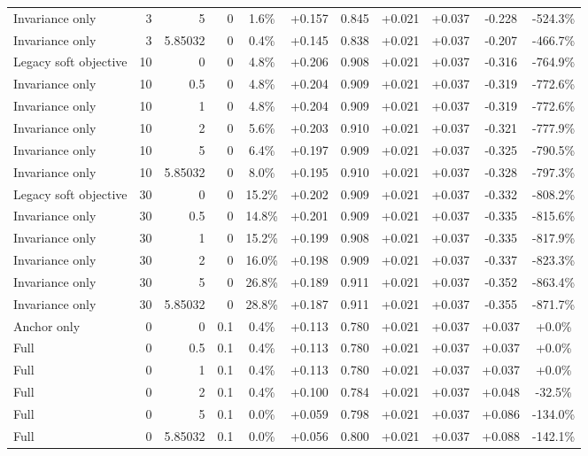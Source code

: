\begin{table}[htbp]
\begin{tabular}{lrrrccccccc}
Invariance only & 3 & 5 & 0 & 1.6\% & +0.157 & 0.845 & +0.021 & +0.037 & -0.228 & -524.3\% \\
Invariance only & 3 & 5.85032 & 0 & 0.4\% & +0.145 & 0.838 & +0.021 & +0.037 & -0.207 & -466.7\% \\
Legacy soft objective & 10 & 0 & 0 & 4.8\% & +0.206 & 0.908 & +0.021 & +0.037 & -0.316 & -764.9\% \\
Invariance only & 10 & 0.5 & 0 & 4.8\% & +0.204 & 0.909 & +0.021 & +0.037 & -0.319 & -772.6\% \\
Invariance only & 10 & 1 & 0 & 4.8\% & +0.204 & 0.909 & +0.021 & +0.037 & -0.319 & -772.6\% \\
Invariance only & 10 & 2 & 0 & 5.6\% & +0.203 & 0.910 & +0.021 & +0.037 & -0.321 & -777.9\% \\
Invariance only & 10 & 5 & 0 & 6.4\% & +0.197 & 0.909 & +0.021 & +0.037 & -0.325 & -790.5\% \\
Invariance only & 10 & 5.85032 & 0 & 8.0\% & +0.195 & 0.910 & +0.021 & +0.037 & -0.328 & -797.3\% \\
Legacy soft objective & 30 & 0 & 0 & 15.2\% & +0.202 & 0.909 & +0.021 & +0.037 & -0.332 & -808.2\% \\
Invariance only & 30 & 0.5 & 0 & 14.8\% & +0.201 & 0.909 & +0.021 & +0.037 & -0.335 & -815.6\% \\
Invariance only & 30 & 1 & 0 & 15.2\% & +0.199 & 0.908 & +0.021 & +0.037 & -0.335 & -817.9\% \\
Invariance only & 30 & 2 & 0 & 16.0\% & +0.198 & 0.909 & +0.021 & +0.037 & -0.337 & -823.3\% \\
Invariance only & 30 & 5 & 0 & 26.8\% & +0.189 & 0.911 & +0.021 & +0.037 & -0.352 & -863.4\% \\
Invariance only & 30 & 5.85032 & 0 & 28.8\% & +0.187 & 0.911 & +0.021 & +0.037 & -0.355 & -871.7\% \\
Anchor only & 0 & 0 & 0.1 & 0.4\% & +0.113 & 0.780 & +0.021 & +0.037 & +0.037 & +0.0\% \\
Full & 0 & 0.5 & 0.1 & 0.4\% & +0.113 & 0.780 & +0.021 & +0.037 & +0.037 & +0.0\% \\
Full & 0 & 1 & 0.1 & 0.4\% & +0.113 & 0.780 & +0.021 & +0.037 & +0.037 & +0.0\% \\
Full & 0 & 2 & 0.1 & 0.4\% & +0.100 & 0.784 & +0.021 & +0.037 & +0.048 & -32.5\% \\
Full & 0 & 5 & 0.1 & 0.0\% & +0.059 & 0.798 & +0.021 & +0.037 & +0.086 & -134.0\% \\
Full & 0 & 5.85032 & 0.1 & 0.0\% & +0.056 & 0.800 & +0.021 & +0.037 & +0.088 & -142.1\% \\

\end{tabular}
\end{table}
